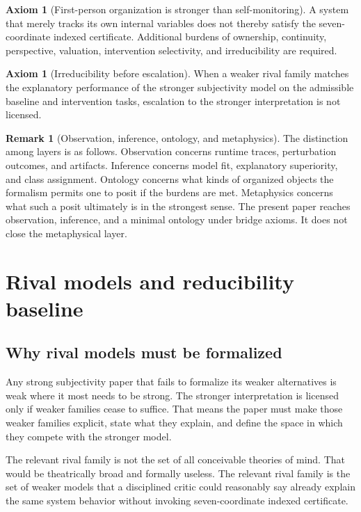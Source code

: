 \documentclass[11pt,a4paper]{article}
\theoremstyle{definition}
\newtheorem{remark}[theorem]{Remark}
\newtheorem{axiom}[theorem]{Axiom}
\begin{document}
\begin{axiom}[First-person organization is stronger than self-monitoring]\label{ax:fp}
A system that merely tracks its own internal variables does not thereby satisfy the seven-coordinate indexed certificate. Additional burdens of ownership, continuity, perspective, valuation, intervention selectivity, and irreducibility are required.
\end{axiom}

\begin{axiom}[Irreducibility before escalation]\label{ax:irred}
When a weaker rival family matches the explanatory performance of the stronger subjectivity model on the admissible baseline and intervention tasks, escalation to the stronger interpretation is not licensed.
\end{axiom}

\begin{remark}[Observation, inference, ontology, and metaphysics]
The distinction among layers is as follows. Observation concerns runtime traces, perturbation outcomes, and artifacts. Inference concerns model fit, explanatory superiority, and class assignment. Ontology concerns what kinds of organized objects the formalism permits one to posit if the burdens are met. Metaphysics concerns what such a posit ultimately is in the strongest sense. The present paper reaches observation, inference, and a minimal ontology under bridge axioms. It does not close the metaphysical layer.
\end{remark}

\section{Rival models and reducibility baseline}
\subsection{Why rival models must be formalized}
Any strong subjectivity paper that fails to formalize its weaker alternatives is weak where it most needs to be strong. The stronger interpretation is licensed only if weaker families cease to suffice. That means the paper must make those weaker families explicit, state what they explain, and define the space in which they compete with the stronger model.

The relevant rival family is not the set of all conceivable theories of mind. That would be theatrically broad and formally useless. The relevant rival family is the set of weaker models that a disciplined critic could reasonably say already explain the same system behavior without invoking seven-coordinate indexed certificate.
\end{document}
